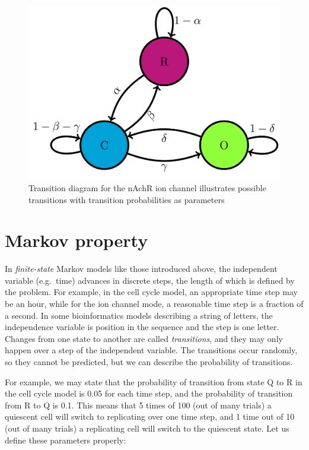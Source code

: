 \documentclass[
]{book}
\theoremstyle{definition}
\theoremstyle{definition}
\theoremstyle{definition}
\theoremstyle{remark}
\begin{document}
\begin{figure}
\centering
\includegraphics{ch10/channel_trans_diag.png}
\caption{Transition diagram for the nAchR ion channel illustrates possible transitions with transition probabilities as parameters}
\end{figure}

\hypertarget{markov-property}{%
\section{Markov property}\label{markov-property}}

\label{sec:math10}

In \emph{finite-state} Markov models like those introduced above, the independent variable (e.g.~time) advances in discrete steps, the length of which is defined by the problem. For example, in the cell cycle model, an appropriate time step may be an hour, while for the ion channel mode, a reasonable time step is a fraction of a second. In some bioinformatics models describing a string of letters, the independence variable is position in the sequence and the step is one letter. Changes from one state to another are called \emph{transitions}, and they may only happen over a step of the independent variable. The transitions occur randomly, so they cannot be predicted, but we can describe the probability of transitions.

For example, we may state that the probability of transition from state Q to R in the cell cycle model is 0.05 for each time step, and the probability of transition from R to Q is 0.1. This means that 5 times of 100 (out of many trials) a quiescent cell will switch to replicating over one time step, and 1 time out of 10 (out of many trials) a replicating cell will switch to the quiescent state. Let us define these parameters properly:
\end{document}
